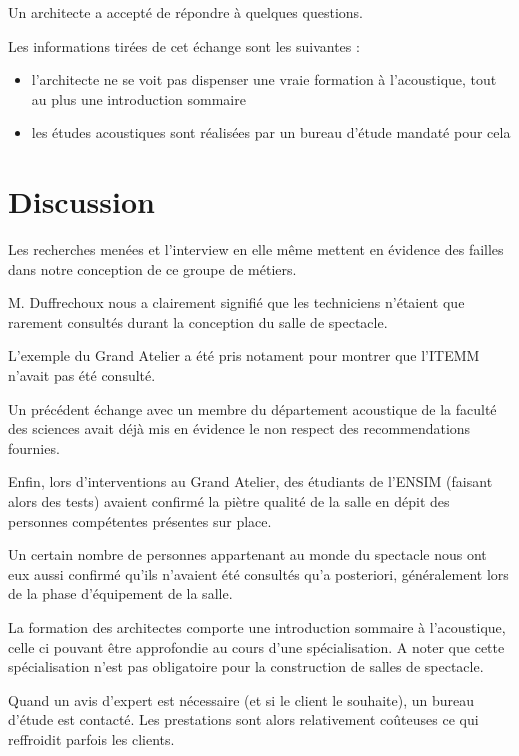 \documentclass[a4paper, 11pt]{report}
\begin{document}
Un architecte a accepté de répondre à quelques questions.

Les informations tirées de cet échange sont les suivantes : 

\begin{itemize}
    \item l'architecte ne se voit pas dispenser une vraie formation à l'acoustique, tout au plus une introduction sommaire
    \item les études acoustiques sont réalisées par un bureau d'étude mandaté pour cela
\end{itemize}


\section{Discussion}

Les recherches menées et l'interview en elle même mettent en évidence des failles dans notre conception de ce groupe de métiers.

M. {\sc Duffrechoux} nous a clairement signifié que les techniciens n'étaient que rarement consultés durant la conception du salle de spectacle.


L'exemple du Grand Atelier a été pris notament pour montrer que l'ITEMM n'avait pas été consulté.

Un précédent échange avec un membre du département acoustique de la faculté des sciences avait déjà mis en évidence le non respect des recommendations fournies.

Enfin, lors d'interventions au Grand Atelier, des étudiants de l'ENSIM (faisant alors des tests) avaient confirmé la piètre qualité de la salle en dépit des personnes compétentes présentes sur place.

\medskip

Un certain nombre de personnes appartenant au monde du spectacle nous ont eux aussi confirmé qu'ils n'avaient été consultés qu'a posteriori, généralement lors de la phase d'équipement de la salle.

La formation des architectes comporte une introduction sommaire à l'acoustique, celle ci pouvant être approfondie au cours d'une spécialisation.
A noter que cette spécialisation n'est pas obligatoire pour la construction de salles de spectacle.

Quand un avis d'expert est nécessaire (et si le client le souhaite), un bureau d'étude est contacté.
Les prestations sont alors relativement coûteuses ce qui reffroidit parfois les clients.
\end{document}
